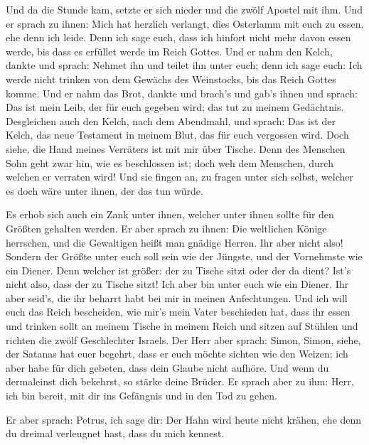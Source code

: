  Und da die Stunde kam, setzte er sich nieder und die
zwölf Apostel mit ihm.  Und er sprach zu ihnen: Mich hat
herzlich verlangt, dies Osterlamm mit euch zu essen, ehe denn ich leide.
 Denn ich sage euch, dass ich hinfort nicht mehr davon
essen werde, bis dass es erfüllet werde im Reich Gottes. 
Und er nahm den Kelch, dankte und sprach: Nehmet ihn und teilet ihn
unter euch;  denn ich sage euch: Ich werde nicht trinken
von dem Gewächs des Weinstocks, bis das Reich Gottes komme.
 Und er nahm das Brot, dankte und brach's und gab's ihnen
und sprach: Das ist mein Leib, der für euch gegeben wird; das tut zu
meinem Gedächtnis.  Desgleichen auch den Kelch, nach dem
Abendmahl, und sprach: Das ist der Kelch, das neue Testament in meinem
Blut, das für euch vergossen wird.  Doch siehe, die Hand
meines Verräters ist mit mir über Tische.  Denn des
Menschen Sohn geht zwar hin, wie es beschlossen ist; doch weh dem
Menschen, durch welchen er verraten wird!  Und sie fingen
an, zu fragen unter sich selbst, welcher es doch wäre unter ihnen, der
das tun würde.

 Es erhob sich auch ein Zank unter ihnen, welcher unter
ihnen sollte für den Größten gehalten werden.  Er aber
sprach zu ihnen: Die weltlichen Könige herrschen, und die Gewaltigen
heißt man gnädige Herren.  Ihr aber nicht also! Sondern
der Größte unter euch soll sein wie der Jüngste, und der Vornehmste wie
ein Diener.  Denn welcher ist größer: der zu Tische sitzt
oder der da dient? Ist's nicht also, dass der zu Tische sitzt! Ich aber
bin unter euch wie ein Diener.  Ihr aber seid's, die ihr
beharrt habt bei mir in meinen Anfechtungen.  Und ich
will euch das Reich bescheiden, wie mir's mein Vater beschieden hat,
 dass ihr essen und trinken sollt an meinem Tische in
meinem Reich und sitzen auf Stühlen und richten die zwölf Geschlechter
Israels.  Der Herr aber sprach: Simon, Simon, siehe, der
Satanas hat euer begehrt, dass er euch möchte sichten wie den Weizen;
 ich aber habe für dich gebeten, dass dein Glaube nicht
aufhöre. Und wenn du dermaleinst dich bekehrst, so stärke deine Brüder.
 Er sprach aber zu ihm: Herr, ich bin bereit, mit dir ins
Gefängnis und in den Tod zu gehen.

 Er aber sprach: Petrus, ich sage dir: Der Hahn wird
heute nicht krähen, ehe denn du dreimal verleugnet hast, dass du mich
kennest.


